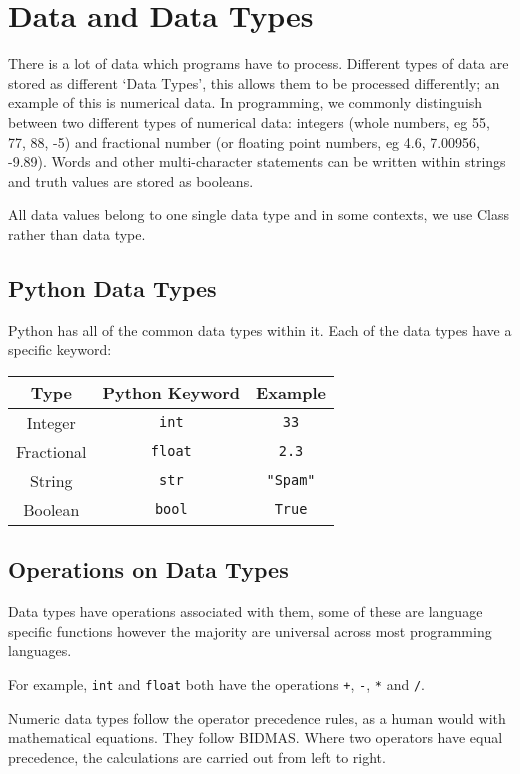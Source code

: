 
\section*{Data and Data Types}
There is a lot of data which programs have to process. Different types of data are stored as different `Data Types', this allows them to be processed differently; an example of this is numerical data. In programming, we commonly distinguish between two different types of numerical data: integers (whole numbers, eg 55, 77, 88, -5) and fractional number (or floating point numbers, eg 4.6, 7.00956, -9.89). Words and other multi-character statements can be written within strings and truth values are stored as booleans.

All data values belong to one single data type and in some contexts, we use Class rather than data type.

\subsection*{Python Data Types}
Python has all of the common data types within it. Each of the data types have a specific keyword:
\begin{table}[H]
    \centering
    \begin{tabularx}{0.45\textwidth}{c|c|c}
        Type & Python Keyword & Example\\
        \hline
        Integer & \verb|int| & \verb|33|\\
        Fractional & \verb|float| & \verb|2.3|\\
        String & \verb|str| & \verb|"Spam"|\\
        Boolean & \verb|bool| & \verb|True|        
    \end{tabularx}
\end{table}

\subsection*{Operations on Data Types}
Data types have operations associated with them, some of these are language specific functions however the majority are universal across most programming languages.

For example, \verb|int| and \verb|float| both have the operations \verb|+|, \verb|-|, \verb|*| and \verb|/|. 

Numeric data types follow the operator precedence rules, as a human would with mathematical equations. They follow BIDMAS. Where two operators have equal precedence, the calculations are carried out from left to right.

